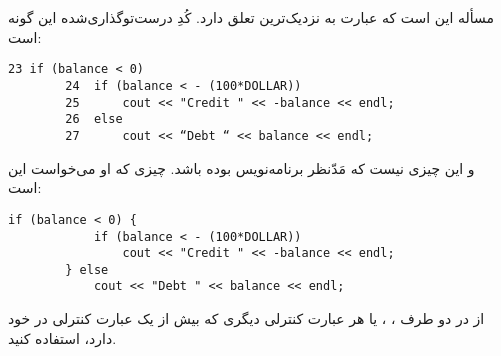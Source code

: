 \section{}
\paragraph{}\label{answer:31}
مسأله این است که عبارت  به نزدیک‌ترین  تعلق دارد. کُدِ درست‌توگذاری‌شده این گونه است:
\begin{LTR}
    \begin{lstlisting}[style=C++Style]
        23 if (balance < 0)
        24 	if (balance < - (100*DOLLAR))
        25 		cout << "Credit " << -balance << endl;
        26 	else
        27 		cout << “Debt “ << balance << endl;
    \end{lstlisting}
\end{LTR}

و این چیزی نیست که مَدّنظر برنامه‌نویس بوده باشد. چیزی که او می‌خواست این است:
\begin{LTR}
    \begin{lstlisting}[style=C++Style]
        if (balance < 0) {
            if (balance < - (100*DOLLAR))
                cout << "Credit " << -balance << endl;
        } else
            cout << "Debt " << balance << endl;
    \end{lstlisting}
\end{LTR}

از \lr{\texttt{\{\}}} در دو طرف ، ،  یا هر عبارت کنترلی دیگری که بیش از یک عبارت کنترلی در خود دارد، استفاده کنید.
